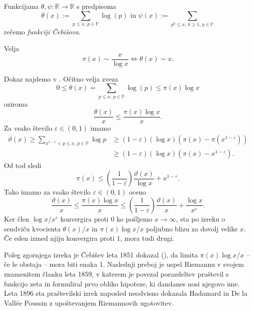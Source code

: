 \begin{definicija}
\label{def_cebisevi_funkciji}
Funkcijama $\theta, \psi : \mathbb{R} \to \mathbb{R}$ s predpisoma \begin{equation*}
\theta(x) := \sum_{p \le x, \,   p \in \mathbb{P}} \log(p) \text{ in } \psi(x) := \sum_{p^{k} \le x, \,  k \ge  1 , \,   p \in \mathbb{P}}
\end{equation*}  
rečemo \emph{funkciji Čebišova}.
\end{definicija}

\begin{izrek}[Čebišov]
\label{izr_cebisov}
  Velja \begin{equation*}
  \pi(x) \sim \frac{x}{\log x} \iff \theta(x) \sim x.
  \end{equation*} 
\end{izrek}
\begin{dokaz}
Dokaz najdemo v \cite[str.~4]{mit_lecture_notes_2021}. Očitno velja zveza \begin{equation*}
  0 \le  \theta(x) = \sum_{p \le x, \,   p \in \mathbb{P}} \log(p) \le  \pi(x) \log x
\end{equation*}  
oziroma \begin{equation*}
  \frac{\theta(x)}{x} \le  \frac{\pi(x) \log x}{x}. 
  \end{equation*} 
  Za vsako število $\varepsilon \in  (0,1)$ imamo \begin{align*}
    \vartheta(x) \geq \sum_{x^{1-\varepsilon} < p \leq x, \, p \in \mathbb{P}} \log p &\geq (1-\varepsilon)(\log x)\left(\pi(x) - \pi(x^{1-\varepsilon})\right) \\
     &\geq (1-\varepsilon)(\log x)(\pi(x) - x^{1-\varepsilon}).
  \end{align*}
  Od tod sledi \begin{equation*}
    \pi(x) \leq \left(\frac{1}{1-\varepsilon}\right)\frac{\vartheta(x)}{\log x} + x^{1-\varepsilon}.
  \end{equation*}  
  Tako imamo za vsako število $\varepsilon \in  (0,1)$ oceno \begin{equation*}
    \frac{\vartheta(x)}{x} \leq \frac{\pi(x)\log x}{x} \leq \left(\frac{1}{1-\varepsilon}\right)\frac{\vartheta(x)}{x} + \frac{\log x}{x^{\varepsilon}}.
  \end{equation*}  
  Ker člen $\log x / x^{\varepsilon}$ konvergira proti 0 ko pošljemo $x \to \infty$, sta po izreku o sendviču kvocienta $\theta(x) / x$ in $\pi(x) \log x / x$ poljubno blizu za dovolj velike $x$.
  Če eden izmed njiju konvergira proti $1$, mora tudi drugi.
\end{dokaz}
Poleg zgornjega izreka je Čebišev leta 1851 dokazal (\cite[str.~4--5]{Granville_1993}), da limita $\pi(x) \log x / x$ -- če le obstaja -- mora biti enaka 1. Naslednji preboj je uspel Riemannu v svojem znamenitem članku \cite{Riemann_1859} leta 1859, v katerem je povezal porazdeltev praštevil s funkcijo zeta in formuliral prvo obliko hipoteze, ki dandanes nosi njegovo ime.
Leta 1896 sta praštevilski izrek naposled neodvisno dokazala Hadamard in De la Vallée Poussin z upoštevanjem Riemannovih ugotovitev. 

